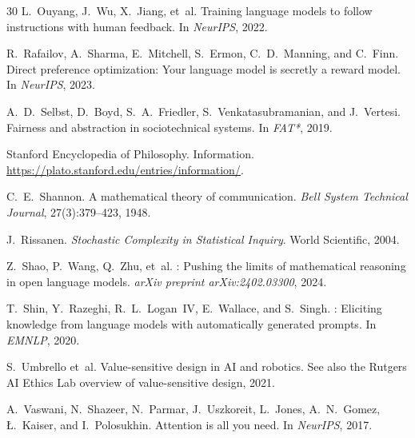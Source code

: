 \documentclass[preprint]{article}
\begin{document}
\begin{thebibliography}{30}
L.~Ouyang, J.~Wu, X.~Jiang, et~al.
\newblock Training language models to follow instructions with human feedback.
\newblock In \emph{NeurIPS}, 2022.

R.~Rafailov, A.~Sharma, E.~Mitchell, S.~Ermon, C.~D.~Manning, and C.~Finn.
\newblock Direct preference optimization: Your language model is secretly a reward model.
\newblock In \emph{NeurIPS}, 2023.

A.~D.~Selbst, D.~Boyd, S.~A.~Friedler, S.~Venkatasubramanian, and J.~Vertesi.
\newblock Fairness and abstraction in sociotechnical systems.
\newblock In \emph{FAT*}, 2019.

{Stanford Encyclopedia of Philosophy}.
\newblock Information.
\newblock \url{https://plato.stanford.edu/entries/information/}.

C.~E.~Shannon.
\newblock A mathematical theory of communication.
\newblock \emph{Bell System Technical Journal}, 27(3):379--423, 1948.

J.~Rissanen.
\newblock \emph{Stochastic Complexity in Statistical Inquiry}.
\newblock World Scientific, 2004.

Z.~Shao, P.~Wang, Q.~Zhu, et~al.
: Pushing the limits of mathematical reasoning in open language models.
\newblock \emph{arXiv preprint arXiv:2402.03300}, 2024.

T.~Shin, Y.~Razeghi, R.~L.~Logan~IV, E.~Wallace, and S.~Singh.
: Eliciting knowledge from language models with automatically generated prompts.
\newblock In \emph{EMNLP}, 2020.

S.~Umbrello et~al.
\newblock Value-sensitive design in {AI} and robotics.
\newblock See also the Rutgers AI Ethics Lab overview of value-sensitive design, 2021.

A.~Vaswani, N.~Shazeer, N.~Parmar, J.~Uszkoreit, L.~Jones, A.~N.~Gomez, {\L}.~Kaiser, and I.~Polosukhin.
\newblock Attention is all you need.
\newblock In \emph{NeurIPS}, 2017.

\end{thebibliography}
\end{document}
